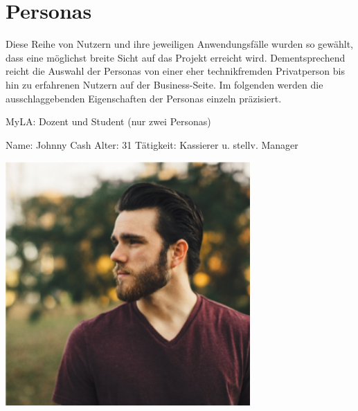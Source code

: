 \section{Personas}
Diese Reihe von Nutzern und ihre jeweiligen Anwendungsfälle wurden so gewählt, dass eine möglichst breite Sicht auf das Projekt erreicht wird.
Dementsprechend reicht die Auswahl der Personas von einer eher technikfremden Privatperson bis hin zu erfahrenen Nutzern auf der Business-Seite.
Im folgenden werden die ausschlaggebenden Eigenschaften der Personas einzeln präzisiert.

MyLA: Dozent und Student (nur zwei Personas)

\begin{minipage}[t]{0.5\textwidth} 	\vspace{0.2\baselineskip} %
	\begin{entrylist}
		\entry
		{Name:}
		{Johnny Cash}
			\entry
		{Alter:}
		{31}
		\entry
		{Tätigkeit:}
		{Kassierer u. stellv. Manager}
	\end{entrylist}
	\begin{barchart}{5.0}\hspace{-1mm}
	\end{barchart}
\end{minipage}
\hfil
\begin{minipage}[t]{0.4\textwidth} 	\vspace{0.0\baselineskip} %
	\flushright
	\includegraphics[width=0.70\textwidth]{img/personas/johnny}
\end{minipage}

